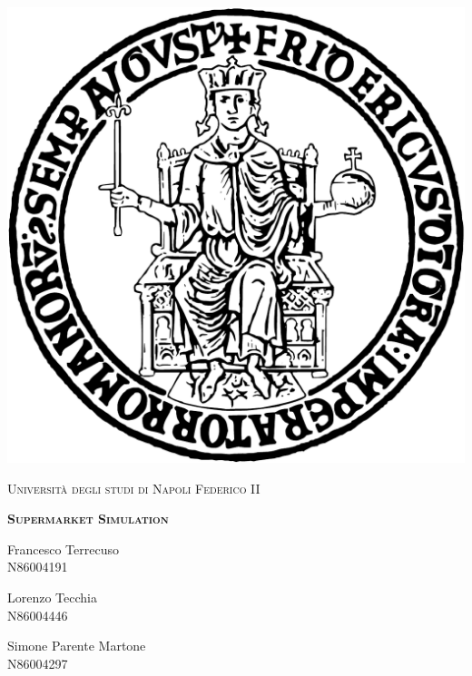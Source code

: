 \documentclass[a4paper, 12pt]{article}
\begin{document}
\begin{titlepage}

\begin{center}
   \includegraphics[scale=0.4]{Images/logo-federico-II.pdf} 
\end{center}
   
\thispagestyle{empty}

\center

\textsc{\large Università degli studi di Napoli Federico II}

\vspace{0.5in}

\noindent\makebox[\linewidth]{\rule{\linewidth}{1.2pt}}
\textsc{ \textbf{\large Supermarket Simulation }}
\noindent\makebox[\linewidth]{\rule{\linewidth}{1.2pt}}

\vspace{0.5in}

\begin{minipage}{0.30\textwidth}
    \begin{flushleft}
        Francesco Terrecuso \\
        N86004191
    \end{flushleft}
\end{minipage}
\begin{minipage}{0.30\textwidth}
    \begin{center}
        Lorenzo Tecchia \\
        N86004446
    \end{center}
\end{minipage}
\begin{minipage}{0.35\textwidth}
    \begin{flushright}
        Simone Parente Martone \\
        N86004297
    \end{flushright}
\end{minipage}


\end{titlepage}
\end{document}
